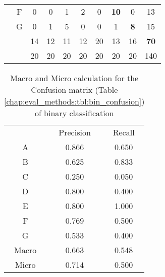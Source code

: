 {\begin{table}[H]
\begin{tabular}{c c c c c c c c c c}
		& \multicolumn{1}{|c}{F} & \multicolumn{1}{|c}{0} & \multicolumn{1}{c}{0} & \multicolumn{1}{c}{1} & \multicolumn{1}{c}{2} & \multicolumn{1}{c}{0} & \multicolumn{1}{c}{\textbf{10}} & \multicolumn{1}{c|}{0} & 13 \\
		& \multicolumn{1}{|c}{G} & \multicolumn{1}{|c}{0} & \multicolumn{1}{c}{1} & \multicolumn{1}{c}{5} & \multicolumn{1}{c}{0} & \multicolumn{1}{c}{0} & \multicolumn{1}{c}{1} & \multicolumn{1}{c|}{\textbf{8}} & 15 \\
		\cline{2-9}
		&  & 14 & 12 & 11 & 12 & 20 & 13 & 16 & \textbf{70}\\
		\cline{2-10}
		&  & 20 & 20 & 20 & 20 & 20 & 20 & 20 & 140\\
	\end{tabular}
\end{table}


\begin{table}[H]
	\center
	\caption{Macro and Micro calculation for the Confusion matrix (Table \ref{chap:eval_methods:tbl:bin_confusion}) of binary classification}\label{chap:eval_methods:tbl:bin_macro_vs_micro}
	\begin{tabular}{l l l}
		\cline{2-3}
		& \multicolumn{1}{|c}{Precision} & \multicolumn{1}{c|}{Recall}\\
		\cline{1-3}
		\multicolumn{1}{|c}{A} & \multicolumn{1}{|c}{0.866} & \multicolumn{1}{c|}{0.650}\\
		\multicolumn{1}{|c}{B} & \multicolumn{1}{|c}{0.625} & \multicolumn{1}{c|}{0.833}\\
		\multicolumn{1}{|c}{C} & \multicolumn{1}{|c}{0.250} & \multicolumn{1}{c|}{0.050}\\
		\multicolumn{1}{|c}{D} & \multicolumn{1}{|c}{0.800} & \multicolumn{1}{c|}{0.400}\\
		\multicolumn{1}{|c}{E} & \multicolumn{1}{|c}{0.800} & \multicolumn{1}{c|}{1.000}\\
		\multicolumn{1}{|c}{F} & \multicolumn{1}{|c}{0.769} & \multicolumn{1}{c|}{0.500}\\
		\multicolumn{1}{|c}{G} & \multicolumn{1}{|c}{0.533} & \multicolumn{1}{c|}{0.400}\\
		\cline{1-3}
		\multicolumn{1}{|c}{Macro} & \multicolumn{1}{|c}{0.663} & \multicolumn{1}{c|}{0.548}\\
		\multicolumn{1}{|c}{Micro} & \multicolumn{1}{|c}{0.714} & \multicolumn{1}{c|}{0.500}\\
		\cline{1-3}
	\end{tabular}
\end{table}


}
